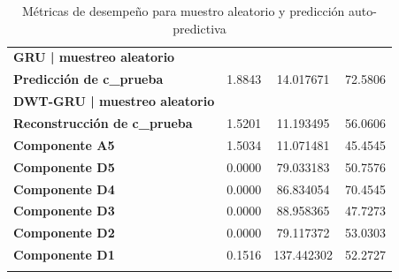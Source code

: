 \begin{longtable}{lccc}
\textbf{GRU | muestreo aleatorio} &  &  &  \\
    \textbf{Predicción de c\_prueba} & 1.8843 & 14.017671 & 72.5806 \\
\textbf{DWT-GRU | muestreo aleatorio} &  &  &  \\
\textbf{Reconstrucción de c\_prueba} & 1.5201 & 11.193495 & 56.0606 \\
\textbf{Componente A5} & 1.5034 & 11.071481 & 45.4545 \\
\textbf{Componente D5} & 0.0000 & 79.033183 & 50.7576 \\
\textbf{Componente D4} & 0.0000 & 86.834054 & 70.4545 \\
\textbf{Componente D3} & 0.0000 & 88.958365 & 47.7273 \\
\textbf{Componente D2} & 0.0000 & 79.117372 & 53.0303 \\
\textbf{Componente D1} & 0.1516 & 137.442302 & 52.2727 \\
\caption{Métricas de desempeño para muestro aleatorio y predicción auto-predictiva}
\label{tab:resultados_prediccion_aregresiva_m_aleatorio}
\end{longtable}
  
  
